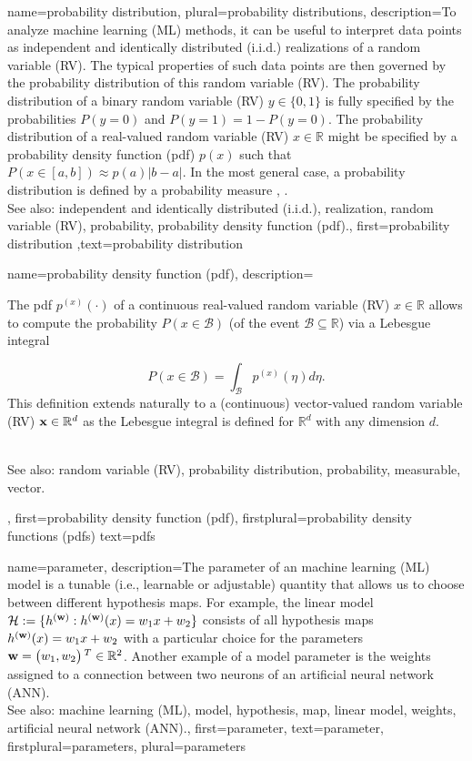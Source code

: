{
{name={probability distribution}, plural={probability distributions},
	description={To analyze machine learning (ML) methods, it can be useful 
		to interpret data points as independent and identically distributed (i.i.d.) realizations of a random variable (RV). The typical 
		properties of such data points are then governed by the probability distribution 
		of this random variable (RV). The probability distribution of a binary random variable (RV) $y \in \{0,1\}$ 
		is fully specified by the probabilities $P\left(y = 0\right)$ and 
		$P\left(y=1\right)\!=\!1\!-\!P\left(y=0\right)$. The probability 
		distribution of a real-valued random variable (RV) $x \in \mathbb{R}$ might be specified 
		by a probability density function (pdf) $p(x)$ such that $P\left( x \in [a,b] \right) \approx  p(a) |b-a|$. 
	    	In the most general case, a probability distribution is defined by a probability measure 
		\cite{BillingsleyProbMeasure}, \cite{GrayProbBook}.
	    		\\
		See also: independent and identically distributed (i.i.d.), realization, random variable (RV), probability, probability density function (pdf).},
	first={probability distribution}
	,text={probability distribution}
}
    
    
{name={probability density function (pdf)},
	description={The pdf 
	$p^{(x)}\left(\cdot\right)$ of a continuous real-valued random variable (RV) $x \in \mathbb{R}$ 
	allows to compute the probability $P\left(x \in \mathcal{B}\right)$ (of 
	the event $\mathcal{B} \subseteq \mathbb{R}$)
	via a Lebesgue integral \cite[Ch. 3]{BertsekasProb}
	
	
	
	 $$P\left(x \in \mathcal{B}\right) = \int_{\mathcal{B}} p^{(x)}\left(\eta\right) d 
	 \eta.$$ 
	 This definition extends naturally to a (continuous) vector-valued random variable (RV) 
	 ${\bf x} \in \mathbb{R}^{d}$ as the Lebesgue integral 
	 is defined for $\mathbb{R}^{d}$ with any dimension $d$. 
	
	
	
    
        		\\
		See also: random variable (RV), probability distribution, probability, measurable, vector.},
	first={probability density function (pdf)},
	firstplural={probability density functions (pdfs)}
	text={pdfs}
}


{name={parameter},
	description={The parameter of an machine learning (ML) model is a tunable (i.e., learnable or adjustable) quantity that 
		allows us to choose between different hypothesis maps. For example, the linear model 
		$\mathcal{H} := \{h^{({\bf w})}: h^{({\bf w})}(x)= w_{1} x + w_{2}\}$ 
		consists of all hypothesis maps $h^{({\bf w})}(x)= w_{1} x + w_{2}$ 
		with a particular choice for the parameters ${\bf w} = \big(w_{1},w_{2}\big)\,^{T} \in \mathbb{R}^{2}$. 
		Another example of a model parameter is the weights assigned to a connection between two neurons of an artificial neural network (ANN).
				\\
		See also: machine learning (ML), model, hypothesis, map, linear model, weights, artificial neural network (ANN).},
	first={parameter},
	text={parameter},
	firstplural={parameters}, 
 	plural={parameters}
}

}
